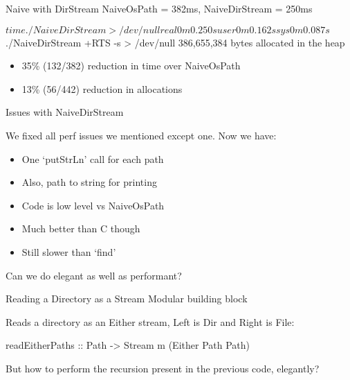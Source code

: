 \documentclass[17pt]{beamer}
\begin{document}
\begin{frame}[fragile]{Naive with DirStream}
{NaiveOsPath = 382ms, NaiveDirStream = 250ms}

\begin{code}
$ time ./NaiveDirStream > /dev/null
real    0m0.250s
user    0m0.162s
sys     0m0.087s

$ ./NaiveDirStream +RTS -s > /dev/null
     386,655,384 bytes allocated in the heap
\end{code}

\scriptsize
\begin{itemize}
\item 35\% (132/382) reduction in time over NaiveOsPath
\item 13\% (56/442) reduction in allocations
\end{itemize}

\end{frame}

\begin{frame}{Issues with NaiveDirStream}{}

We fixed all perf issues we mentioned except one. Now we have:
\begin{itemize}
  \item One `putStrLn' call for each path
  \item Also, path to string for printing
  \item Code is low level vs NaiveOsPath
  \item Much better than C though
  \item Still slower than `find'
\end{itemize}

Can we do elegant as well as performant?
\end{frame}

\begin{frame}[fragile]{Reading a Directory as a Stream}
{Modular building block}

Reads a directory as an Either stream, Left is Dir and Right is File:
\begin{code}
readEitherPaths
  :: Path
  -> Stream m (Either Path Path)
\end{code}

But how to perform the recursion present in the previous code, elegantly?

\end{frame}
\end{document}
